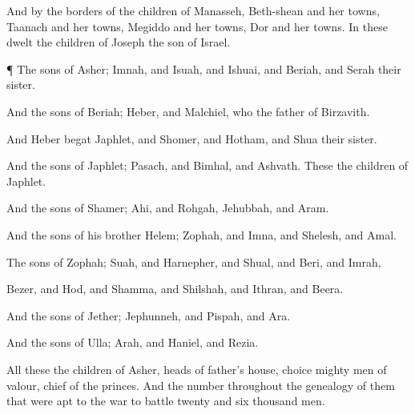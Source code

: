 {And by the
borders of the
children of
Manasseh,
Beth-shean and her
towns,
Taanach and her
towns,
Megiddo and her
towns,
Dor and her
towns. In these
dwelt the
children of
Joseph the
son of
Israel.


\par }{\PP {}¶ The
sons of
Asher;
Imnah, and
Isuah, and
Ishuai, and
Beriah, and
Serah their
sister.

And the
sons of
Beriah;
Heber, and
Malchiel, who
{} the
father of
Birzavith.

And
Heber
begat
Japhlet, and
Shomer, and
Hotham, and
Shua their
sister.

And the
sons of
Japhlet;
Pasach, and
Bimhal, and
Ashvath. These
{} the
children of
Japhlet.

And the
sons of
Shamer;
Ahi, and
Rohgah,
Jehubbah, and
Aram.

And the
sons of his
brother
Helem;
Zophah, and
Imna, and
Shelesh, and
Amal.

The
sons of
Zophah;
Suah, and
Harnepher, and
Shual, and
Beri, and
Imrah,

Bezer, and
Hod, and
Shamma, and
Shilshah, and
Ithran, and
Beera.

And the
sons of
Jether;
Jephunneh, and
Pispah, and
Ara.

And the
sons of
Ulla;
Arah, and
Haniel, and
Rezia.

All these
{} the
children of
Asher,
heads of
{}
father’s
house,
choice
{} mighty
men of
valour,
chief of the
princes. And the
number throughout the
genealogy of them that were apt to the
war
{} to
battle
{}
twenty and
six
thousand
men.




\par }
